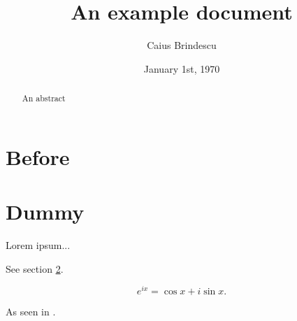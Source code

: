 \documentclass{article}
\title{An example document}
\author{Caius Brindescu}
\date{January 1st, 1970}
\begin{document}
\maketitle

\begin{abstract}
An abstract
\end{abstract}

\section{Before}

\section{Dummy}
\label{sec:dummy}
Lorem ipsum...

See section \ref{sec:dummy}.

\begin{equation}
e^{ix} = \cos{x} + i \sin{x}.
\label{eq:euler}
\end{equation}

As seen in \cite{knuth1992literate}.



\end{document}

